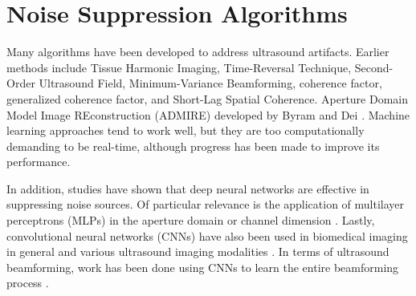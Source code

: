


\section{Noise Suppression Algorithms}

Many algorithms have been developed to address ultrasound artifacts. Earlier methods include Tissue Harmonic Imaging, Time-Reversal Technique, Second-Order Ultrasound Field, Minimum-Variance Beamforming, coherence factor, generalized coherence factor, and Short-Lag Spatial Coherence\cite{slsc}. Aperture Domain Model Image REconstruction (ADMIRE) developed by Byram and Dei \cite{admire2015}. Machine learning approaches tend to work well, but they are too computationally demanding to be real-time, although progress has been made to improve its performance.

In addition, studies have shown that deep neural networks are effective in suppressing noise sources. Of particular relevance is the application of multilayer perceptrons (MLPs) in the aperture domain or channel dimension \cite{luchies_tmi_2018}. Lastly, convolutional neural networks (CNNs) have also been used in biomedical imaging in general \cite{unet} and various ultrasound imaging modalities \cite{van_sloun_review}. In terms of ultrasound beamforming, work has been done using CNNs to learn the entire beamforming process \cite{hyun_uffc_2019}.



